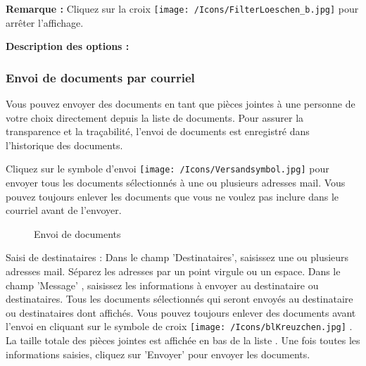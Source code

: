 \textbf{Remarque :} Cliquez sur la croix \texttt{[image: /Icons/FilterLoeschen\_b.jpg]}  pour arrêter l'affichage. 

\vspace{\baselineskip}

\textbf{Description des options :}

\subsubsection{Envoi de documents par courriel}
\label{bkm:Ref201701127}

Vous pouvez envoyer des documents en tant que pièces jointes à une personne de votre choix directement depuis la liste de documents. Pour assurer la transparence et la traçabilité, l'envoi de documents est enregistré dans l'historique des documents.

Cliquez sur le symbole d'envoi \texttt{[image: /Icons/Versandsymbol.jpg]} pour envoyer tous les documents sélectionnés à une ou plusieurs adresses mail. Vous pouvez toujours enlever les documents que vous ne voulez pas inclure dans le courriel avant de l'envoyer.

\begin{figure}[H]
\caption{Envoi de documents}
\end{figure}

Saisi de destinataires  : Dans le champ 'Destinataires', saisissez une ou plusieurs adresses mail. Séparez les adresses par un point virgule ou un espace.
Dans le champ 'Message' , saisissez les informations à envoyer au destinataire ou destinataires. Tous les documents sélectionnés qui seront envoyés au destinataire ou destinataires dont affichés. Vous pouvez toujours enlever des documents avant l'envoi en cliquant sur le symbole de croix \texttt{[image: /Icons/blKreuzchen.jpg]} . La taille totale des pièces jointes est affichée en bas de la liste . Une fois toutes les informations saisies, cliquez sur 'Envoyer'  pour envoyer les documents.


